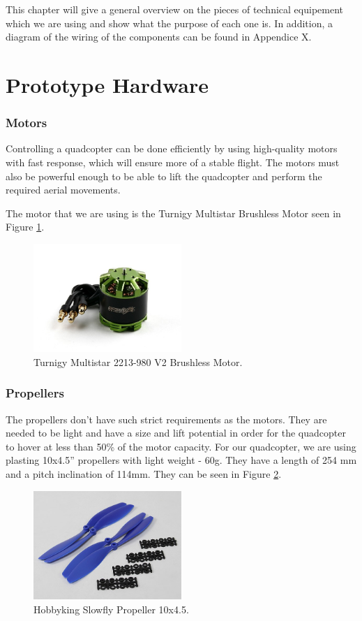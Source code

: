 This chapter will give a general overview on the pieces of technical equipement which we are using and show what the purpose of each one is. In addition, a diagram of the wiring of the components can be found in Appendice X. %

\section{Prototype Hardware}

\subsubsection{Motors}
Controlling a quadcopter can be done efficiently by using high-quality motors with fast response, which will ensure more of a stable flight. The motors must also be powerful enough to be able to lift the quadcopter and perform the required aerial movements. 

The motor that we are using is the Turnigy Multistar Brushless Motor seen in Figure \ref{motor}.

\begin{figure}[H]
  \centering
    \includegraphics[width=0.5\textwidth]{images/motor.jpg}
	\caption{Turnigy Multistar 2213-980 V2 Brushless Motor.}
	\label{motor}
\end{figure}

\subsubsection{Propellers}
The propellers don't have such strict requirements as the motors. They are needed to be light and have a size and lift potential in order for the quadcopter to hover at less than 50\% of the motor capacity. For our quadcopter, we are using plasting 10x4.5'' propellers with light weight - 60g. They have a length of 254 mm and a pitch inclination of 114mm. They can be seen in Figure \ref{propeller}.

\begin{figure}[H]
  \centering
    \includegraphics[width=0.5\textwidth]{images/propeller.jpg}
	\caption{Hobbyking Slowfly Propeller 10x4.5.}
	\label{propeller}
\end{figure}

